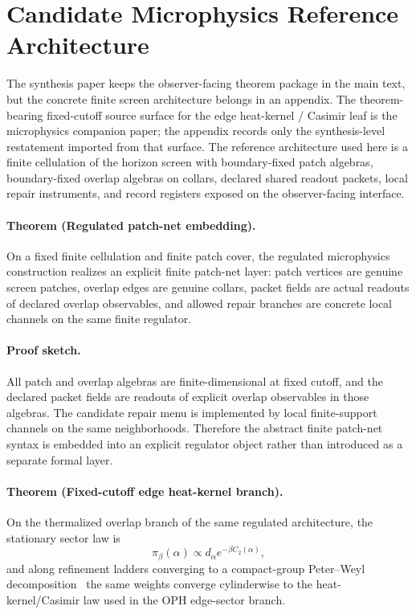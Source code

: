\section{Candidate Microphysics Reference Architecture}

The synthesis paper keeps the observer-facing theorem package in the main text, but the concrete
finite screen architecture belongs in an appendix. The theorem-bearing fixed-cutoff
source surface for the edge heat-kernel / Casimir leaf is the microphysics companion paper; the
appendix records only the synthesis-level restatement imported from that surface. The reference
architecture used here is a finite cellulation of the horizon screen with boundary-fixed patch
algebras, boundary-fixed overlap algebras on collars, declared shared readout packets, local
repair instruments, and record registers exposed on the observer-facing interface.

\paragraph{Theorem (Regulated patch-net embedding).}
On a fixed finite cellulation and finite patch cover, the regulated microphysics construction realizes an
explicit finite patch-net layer: patch vertices are genuine screen patches, overlap edges are
genuine collars, packet fields are actual readouts of declared overlap observables, and allowed
repair branches are concrete local channels on the same finite regulator.

\paragraph{Proof sketch.}
All patch and overlap algebras are finite-dimensional at fixed cutoff, and the declared packet
fields are readouts of explicit overlap observables in those algebras. The candidate repair menu
is implemented by local finite-support channels on the same neighborhoods. Therefore the abstract
finite patch-net syntax is embedded into an explicit regulator object rather than introduced as a
separate formal layer.

\paragraph{Theorem (Fixed-cutoff edge heat-kernel branch).}
On the thermalized overlap branch of the same regulated architecture, the stationary sector law is
\[
\pi_\beta(\alpha)\propto d_\alpha e^{-\beta C_2(\alpha)},
\]
and along refinement ladders converging to a compact-group Peter--Weyl decomposition~\cite{peterWeyl27} the same
weights converge cylinderwise to the heat-kernel/Casimir law used in the OPH edge-sector branch.

